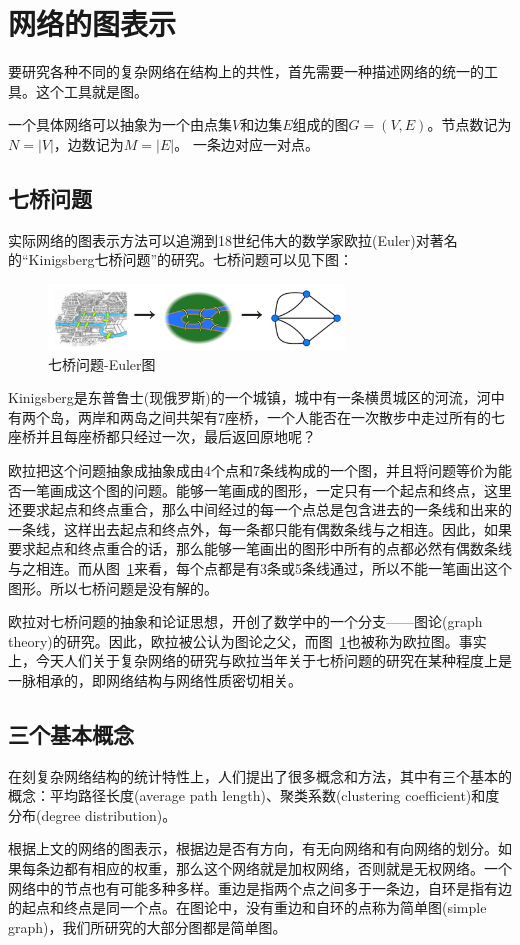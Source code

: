 \documentclass[11pt]{article}
\begin{document}
		
	\section{网络的图表示}
		要研究各种不同的复杂网络在结构上的共性，首先需要一种描述网络的统一的工具。这个工具就是图。\par
		一个具体网络可以抽象为一个由点集$V$和边集$E$组成的图$G=(V,E)$。节点数记为$N=|V|$，边数记为$M=|E|$。 一条边对应一对点。\par
		
		\subsection{七桥问题}
			实际网络的图表示方法可以追溯到18世纪伟大的数学家欧拉(Euler)对著名的“Kinigsberg七桥问题”的研究。七桥问题可以见下图：
			
			\begin{figure}[htbp]
				\centering
				\includegraphics[width=0.7\textwidth]{pic/01-sevenb.png}
				\caption{七桥问题-Euler图}
				\label{003}
			\end{figure}
			
			Kinigsberg是东普鲁士(现俄罗斯)的一个城镇，城中有一条横贯城区的河流，河中有两个岛，两岸和两岛之间共架有7座桥，一个人能否在一次散步中走过所有的七座桥并且每座桥都只经过一次，最后返回原地呢？ \par
			欧拉把这个问题抽象成抽象成由4个点和7条线构成的一个图，并且将问题等价为能否一笔画成这个图的问题。能够一笔画成的图形，一定只有一个起点和终点，这里还要求起点和终点重合，那么中间经过的每一个点总是包含进去的一条线和出来的一条线，这样出去起点和终点外，每一条都只能有偶数条线与之相连。因此，如果要求起点和终点重合的话，那么能够一笔画出的图形中所有的点都必然有偶数条线与之相连。而从图~\ref{003}来看，每个点都是有3条或5条线通过，所以不能一笔画出这个图形。所以七桥问题是没有解的。\par
			欧拉对七桥问题的抽象和论证思想，开创了数学中的一个分支——图论(graph theory)的研究。因此，欧拉被公认为图论之父，而图~\ref{003}也被称为欧拉图。事实上，今天人们关于复杂网络的研究与欧拉当年关于七桥问题的研究在某种程度上是一脉相承的，即网络结构与网络性质密切相关。
	
		
		\subsection{三个基本概念}
			在刻复杂网络结构的统计特性上，人们提出了很多概念和方法，其中有三个基本的概念：平均路径长度(average path length)、聚类系数(clustering coefficient)和度分布(degree distribution)。\par
			根据上文的网络的图表示，根据边是否有方向，有无向网络和有向网络的划分。如果每条边都有相应的权重，那么这个网络就是加权网络，否则就是无权网络。一个网络中的节点也有可能多种多样。重边是指两个点之间多于一条边，自环是指有边的起点和终点是同一个点。在图论中，没有重边和自环的点称为简单图(simple graph)，我们所研究的大部分图都是简单图。
			
\end{document}
